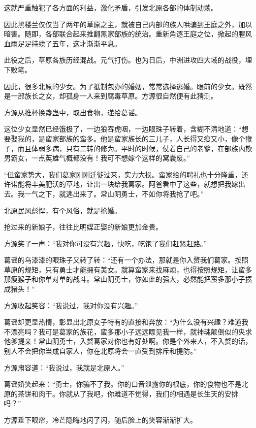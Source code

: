 \begin{this_body}
这就严重触犯了各方面的利益，激化矛盾，引发北原各部的体制动荡。

因此黑楼兰仅仅当了两年的草原之主，就被自己内部的族人哄骗到王庭之外，加以暗害。随即，各部联合起来推翻黑家部族的统治。重新角逐王庭之位，掀起的腥风血雨足足持续了五年，这才渐渐平息。

此役之后，草原各族历经混战。元气打伤。也为日后，中洲进攻四大域的战役，埋下败笔。

因此，很多北原的少女。为了抵制包办的婚姻，常常选择逃婚。眼前的少女。既然是一部族长之女，却孤身一人来到腐毒草原。方源很自然便有此猜测。

方源从推杯换盏蛊中，取出食物，递给葛谣。

这位少女显然已经饿极了，一边狼吞虎咽，一边眼珠子转着，含糊不清地道：“想要娶我的，是蛮家部族的蛮多。他是蛮家族长的三儿子，人长得又瘦又小，像个猴子，而且体弱多病，只有二转的修为。平时的时候，仗着自己的老爹，在部族内欺男霸女，一点英雄气概都没有！我可不想嫁个这样的窝囊废。”

“但蛮家势大，我们葛家刚刚迁徙过来，实力大损。蛮家给的聘礼也十分隆重，还许诺能将丰美肥沃的草地，让出一块给我葛家。阿爸看中了这些，就想把我嫁出去。我一气之下，就逃出来了。常山阴勇士，不如你将我抢了吧。”

北原民风彪悍，有个风俗，就是抢婚。

抢过来的新娘子，往往比明媒正娶的新娘更加金贵。

方源笑了一声：“我对你可没有兴趣，快吃，吃饱了我们赶紧赶路。”

葛谣的乌漆漆的眼珠子又转了转：“还有一个办法，那就是你入赘我们葛家。按照草原的规矩，只有勇士才能拥有美女。就算蛮家来找麻烦，也得按照规矩，让蛮多那瘦猴子和你单对单的战斗。常山阴勇士，你如此的强大，必然能把蛮多那小子揍成猪头！”

方源收起笑容：“我说过，我对你没有兴趣。”

葛谣却更显热情，彰显出北原女子特有的直接和奔放：“为什么没有兴趣？难道我不漂亮吗？我可是葛家的族花，蛮多那小子远远瞟见我一样，就神魂颠倒似的央求他爹提亲！常山阴勇士，入赘葛家对你也有好处啊。你是个外来人，不入赘的话，别人不会把你当成自家人，你在北原将会一直受到排斥和提防。”

方源肃容道：“我说过，我就是北原人。”

葛谣娇笑起来：“勇士，你骗不了我。你的口音泄露你的根底，你的食物也不是北原的茶饼和肉干。你就从了我吧，你难道不觉得，我们的相遇是长生天的安排吗？”

方源垂下眼帘，冷芒隐晦地闪了闪，随后脸上的笑容渐渐扩大。


\end{this_body}
